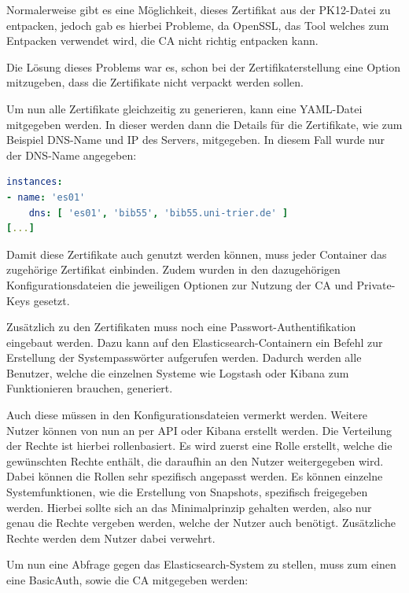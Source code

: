 Normalerweise gibt es eine Möglichkeit, dieses Zertifikat aus der PK12-Datei zu entpacken, jedoch gab es hierbei Probleme, da OpenSSL, das Tool welches zum Entpacken verwendet wird, die CA nicht richtig entpacken kann. \cite{nerophon.2018}

Die Lösung dieses Problems war es, schon bei der Zertifikaterstellung eine Option mitzugeben, dass die Zertifikate nicht verpackt werden sollen. 

Um nun alle Zertifikate gleichzeitig zu generieren, kann eine YAML-Datei mitgegeben werden. In dieser werden dann die Details für die Zertifikate, wie zum Beispiel DNS-Name und IP des Servers, mitgegeben. In diesem Fall wurde nur der DNS-Name angegeben:
\newpage

\begin{lstlisting}[language=YAML, frame=single, label={lst:certs-yml}, caption=Auschnitt aus der Konfigurationsdatei für die Zertifikatgenerierung,captionpos=b] 
instances:
- name: 'es01'
	dns: [ 'es01', 'bib55', 'bib55.uni-trier.de' ]
[...]
\end{lstlisting}

Damit diese Zertifikate auch genutzt werden können, muss jeder Container das zugehörige Zertifikat einbinden. Zudem wurden in den dazugehörigen Konfigurationsdateien die jeweiligen Optionen zur Nutzung der CA und Private-Keys gesetzt.

Zusätzlich zu den Zertifikaten muss noch eine Passwort-Authentifikation eingebaut werden. Dazu kann auf den Elasticsearch-Containern ein Befehl zur Erstellung der Systempasswörter aufgerufen werden. Dadurch werden alle Benutzer, welche die einzelnen Systeme wie Logstash oder Kibana zum Funktionieren brauchen, generiert.

Auch diese müssen in den Konfigurationsdateien vermerkt werden. Weitere Nutzer können von nun an per API oder Kibana erstellt werden. Die Verteilung der Rechte ist hierbei rollenbasiert. Es wird zuerst eine Rolle erstellt, welche die gewünschten Rechte enthält, die daraufhin an den Nutzer weitergegeben wird. Dabei können die Rollen sehr spezifisch angepasst werden. Es können einzelne Systemfunktionen, wie die Erstellung von Snapshots, spezifisch freigegeben werden. Hierbei sollte sich an das Minimalprinzip gehalten werden, also nur genau die Rechte vergeben werden, welche der Nutzer auch benötigt. Zusätzliche Rechte werden dem Nutzer dabei verwehrt. \cite{ElasticsearchB.V..13.2.2020}

Um nun eine Abfrage gegen das Elasticsearch-System zu stellen, muss zum einen eine BasicAuth, sowie die CA mitgegeben werden:

